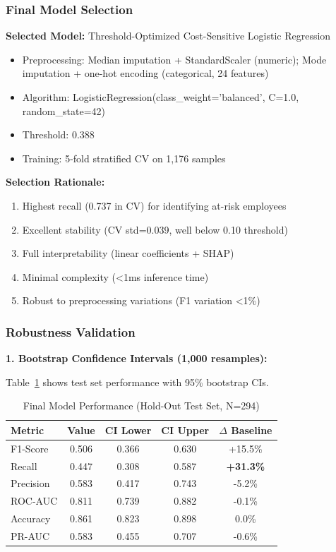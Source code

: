 \documentclass[conference]{IEEEtran}
\begin{document}
\subsubsection{Final Model Selection}

\textbf{Selected Model:} Threshold-Optimized Cost-Sensitive Logistic Regression
\begin{itemize}
    \item Preprocessing: Median imputation + StandardScaler (numeric); Mode imputation + one-hot encoding (categorical, 24 features)
    \item Algorithm: LogisticRegression(class\_weight='balanced', C=1.0, random\_state=42)
    \item Threshold: 0.388
    \item Training: 5-fold stratified CV on 1,176 samples
\end{itemize}

\textbf{Selection Rationale:}
\begin{enumerate}
    \item Highest recall (0.737 in CV) for identifying at-risk employees
    \item Excellent stability (CV std=0.039, well below 0.10 threshold)
    \item Full interpretability (linear coefficients + SHAP)
    \item Minimal complexity (<1ms inference time)
    \item Robust to preprocessing variations (F1 variation <1\%)
\end{enumerate}

\subsubsection{Robustness Validation}

\textbf{1. Bootstrap Confidence Intervals (1,000 resamples):}

Table~\ref{tab:final_metrics} shows test set performance with 95\% bootstrap CIs.

\begin{table}[!t]
\caption{Final Model Performance (Hold-Out Test Set, N=294)}
\label{tab:final_metrics}
\centering
\small
\begin{tabular}{lcccc}
\toprule
\textbf{Metric} & \textbf{Value} & \textbf{CI Lower} & \textbf{CI Upper} & \textbf{$\Delta$ Baseline} \\
\midrule
F1-Score & 0.506 & 0.366 & 0.630 & +15.5\% \\
Recall & 0.447 & 0.308 & 0.587 & \textbf{+31.3\%} \\
Precision & 0.583 & 0.417 & 0.743 & -5.2\% \\
ROC-AUC & 0.811 & 0.739 & 0.882 & -0.1\% \\
Accuracy & 0.861 & 0.823 & 0.898 & 0.0\% \\
PR-AUC & 0.583 & 0.455 & 0.707 & -0.6\% \\
\bottomrule
\end{tabular}
\end{table}
\end{document}
